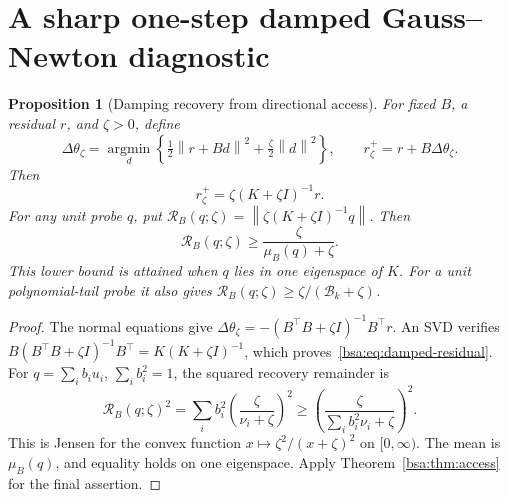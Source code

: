 \documentclass[11pt,letterpaper]{article}
\newcommand{\bsaNorm}[1]{\left\lVert #1\right\rVert}
\newtheorem{bsaProposition}{Proposition}[section]
\theoremstyle{remark}
\theoremstyle{plain}
\begin{document}
\section{A sharp one-step damped Gauss--Newton diagnostic}
\label{bsa:sec:damping}

\begin{bsaProposition}[Damping recovery from directional access]
\label{bsa:prop:damping}
For fixed $B$, a residual $r$, and $\zeta>0$, define
\begin{equation}
 \Delta\theta_\zeta
 =\underset{d}{\operatorname{argmin}}\left\{\tfrac12\bsaNorm{r+Bd}^2
 +\tfrac\zeta2\bsaNorm d^2\right\},\qquad
 r_\zeta^+=r+B\Delta\theta_\zeta.
 \label{bsa:eq:damped-step}
\end{equation}
Then
\begin{equation}
 r_\zeta^+=\zeta(K+\zeta I)^{-1}r.
 \label{bsa:eq:damped-residual}
\end{equation}
For any unit probe $q$, put $\mathcal R_B(q;\zeta)=\bsaNorm{\zeta(K+\zeta I)^{-1}q}$. Then
\begin{equation}
 \boxed{\mathcal R_B(q;\zeta)\ge\frac{\zeta}{\mu_B(q)+\zeta}.}
 \label{bsa:eq:damped-access}
\end{equation}
This lower bound is attained when $q$ lies in one eigenspace of $K$. For a unit polynomial-tail probe it also gives
$\mathcal R_B(q;\zeta)\ge\zeta/(\mathcal B_k+\zeta)$.
\end{bsaProposition}
\begin{proof}
The normal equations give
$\Delta\theta_\zeta=-(B^\top B+\zeta I)^{-1}B^\top r$.
An SVD verifies
$B(B^\top B+\zeta I)^{-1}B^\top=K(K+\zeta I)^{-1}$,
which proves~\eqref{bsa:eq:damped-residual}. For $q=\sum_i b_i u_i$, $\sum_i b_i^2=1$, the squared recovery remainder is
\[
 \mathcal R_B(q;\zeta)^2
 =\sum_i b_i^2\left(\frac\zeta{\nu_i+\zeta}\right)^2
 \ge\left(\frac\zeta{\sum_i b_i^2\nu_i+\zeta}\right)^2.
\]
This is Jensen for the convex function $x\mapsto\zeta^2/(x+\zeta)^2$ on $[0,\infty)$. The mean is $\mu_B(q)$, and equality holds on one eigenspace. Apply Theorem~\ref{bsa:thm:access} for the final assertion.
\end{proof}
\end{document}
